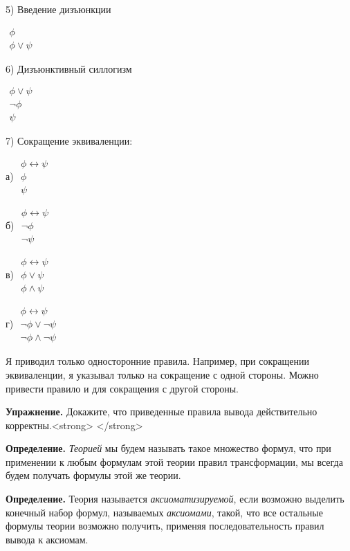 5) Введение дизъюнкции

$\begin{array}{l}\phi \\ \hline \phi \vee \psi\end{array}$

6) Дизъюнктивный силлогизм

$\begin{array}{l}\phi \vee \psi\\ \neg\phi \\ \hline \psi\end{array}$

7) Сокращение эквиваленции:

а) $\begin{array}{l}\phi \leftrightarrow \psi\\ \phi \\ \hline \psi\end{array}$

б) $\begin{array}{l}\phi \leftrightarrow \psi\\ \neg\phi \\ \hline \neg\psi\end{array}$

в) $\begin{array}{l}\phi \leftrightarrow \psi\\ \phi \vee \psi \\ \hline \phi \wedge \psi\end{array}$

г) $\begin{array}{l}\phi \leftrightarrow \psi\\ \neg\phi \vee \neg\psi \\ \hline \neg\phi \wedge \neg\psi\end{array}$

Я приводил только односторонние правила. Например, при сокращении эквиваленции, я указывал только на сокращение с одной стороны. Можно привести правило и для сокращения с другой стороны.

{\bfseries Упражнение.} Докажите, что приведенные правила вывода действительно корректны.<strong>
</strong>

{\bfseries Определение.} {\slshape Теорией} мы будем называть такое множество формул, что при применении к любым формулам этой теории правил трансформации, мы всегда будем получать формулы этой же теории.

{\bfseries Определение.} Теория называется {\slshape аксиоматизируемой}, если возможно выделить конечный набор формул, называемых {\slshape аксиомами}, такой, что все остальные формулы теории возможно получить, применяя последовательность правил вывода к аксиомам.

